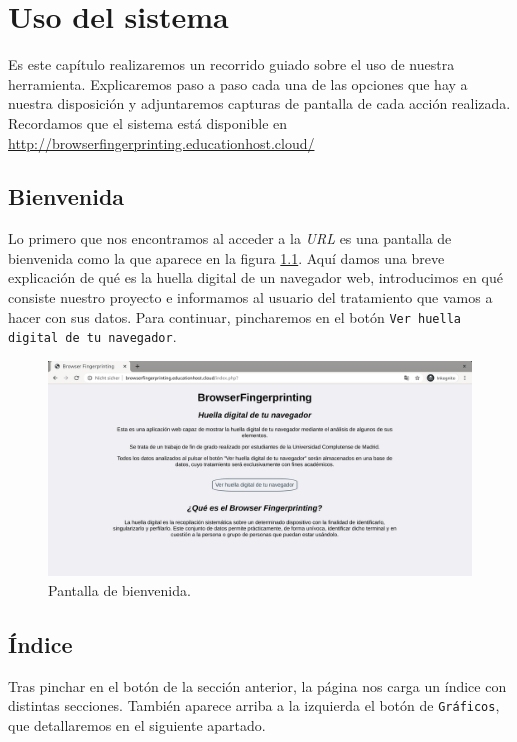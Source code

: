 \chapter{Uso del sistema}
\label{ch:usodelsistema}
Es este capítulo realizaremos un recorrido guiado sobre el uso de nuestra herramienta. Explicaremos paso a paso cada una de las opciones que hay a nuestra disposición y adjuntaremos capturas de pantalla de cada acción realizada. Recordamos que el sistema está disponible en \url{http://browserfingerprinting.educationhost.cloud/}

\section{Bienvenida}

Lo primero que nos encontramos al acceder a la \textit{URL} es una pantalla de bienvenida como la que aparece en la figura \ref{fig:wellcome}. Aquí damos una breve explicación de qué es la huella digital de un navegador web, introducimos en qué consiste nuestro proyecto e informamos al usuario del tratamiento que vamos a hacer con sus datos. Para continuar, pincharemos en el botón \texttt{Ver huella digital de tu navegador}.

\begin{figure}[tbp]
	\centering
	\includegraphics[width=1\textwidth]{Images/wellcome.png}
	\caption{Pantalla de bienvenida.}
	\label{fig:wellcome}
\end{figure}

\section{Índice}

Tras pinchar en el botón de la sección anterior, la página nos carga un índice con distintas secciones. También aparece arriba a la izquierda el botón de \texttt{Gráficos}, que detallaremos en el siguiente apartado.

